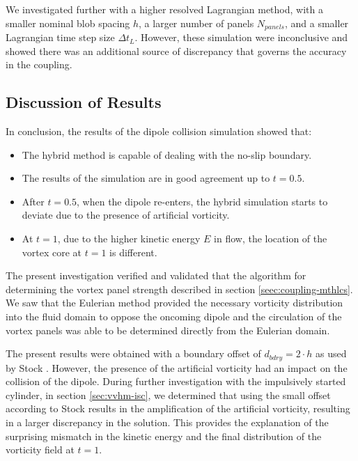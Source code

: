We investigated further with a higher resolved Lagrangian method, with a smaller nominal blob spacing $h$, a larger number of panels $N_{panels}$, and a smaller Lagrangian time step size $\Delta t_L$. However, these simulation were inconclusive and showed there was an additional source of discrepancy that governs the accuracy in the coupling. %


\subsection{Discussion of Results}

In conclusion, the results of the dipole collision simulation showed that:
\begin{itemize}
\item The hybrid method is capable of dealing with the no-slip boundary.
\item The results of the simulation are in good agreement up to $t=0.5$.
\item After $t=0.5$, when the dipole re-enters, the hybrid simulation starts to deviate due to the presence of artificial vorticity.
\item At $t=1$, due to the higher kinetic energy $E$ in flow, the location of the vortex core at $t=1$ is different.
\end{itemize}

The present investigation verified and validated that the algorithm for determining the vortex panel strength described in section \ref{seec:coupling-mthlcs}. We saw that the Eulerian method provided the necessary vorticity distribution into the fluid domain to oppose the oncoming dipole and the circulation of the vortex panels was able to be determined directly from the Eulerian domain.

The present results were obtained with a boundary offset of $d_{bdry}=2\cdot{h}$ as used by Stock \cite{Stock2010a}. However, the presence of the artificial vorticity had an impact on the collision of the dipole. During further investigation with the impulsively started cylinder, in section \ref{sec:vvhm-isc}, we determined that using the small offset according to Stock results in the amplification of the artificial vorticity, resulting in a larger discrepancy in the solution. This provides the explanation of the surprising mismatch in the kinetic energy and the final distribution of the vorticity field at $t=1$.

